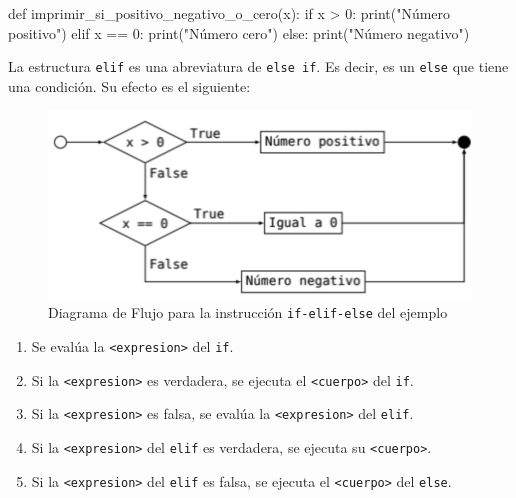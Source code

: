 \documentclass[
  letterpaper,
  DIV=11,
  numbers=noendperiod]{scrreprt}
\newenvironment{Shaded}{\begin{snugshade}}{\end{snugshade}}
\newcommand{\BuiltInTok}[1]{\textcolor[rgb]{0.00,0.23,0.31}{#1}}
\newcommand{\ControlFlowTok}[1]{\textcolor[rgb]{0.00,0.23,0.31}{#1}}
\newcommand{\DecValTok}[1]{\textcolor[rgb]{0.68,0.00,0.00}{#1}}
\newcommand{\KeywordTok}[1]{\textcolor[rgb]{0.00,0.23,0.31}{#1}}
\newcommand{\NormalTok}[1]{\textcolor[rgb]{0.00,0.23,0.31}{#1}}
\newcommand{\OperatorTok}[1]{\textcolor[rgb]{0.37,0.37,0.37}{#1}}
\newcommand{\StringTok}[1]{\textcolor[rgb]{0.13,0.47,0.30}{#1}}
\providecommand{\tightlist}{%
  \setlength{\itemsep}{0pt}\setlength{\parskip}{0pt}}\usepackage{longtable,booktabs,array}
\begin{document}
\begin{Shaded}
\begin{Highlighting}[]
\KeywordTok{def}\NormalTok{ imprimir\_si\_positivo\_negativo\_o\_cero(x):}
  \ControlFlowTok{if}\NormalTok{ x }\OperatorTok{\textgreater{}} \DecValTok{0}\NormalTok{:}
      \BuiltInTok{print}\NormalTok{(}\StringTok{"Número positivo"}\NormalTok{)}
  \ControlFlowTok{elif}\NormalTok{ x }\OperatorTok{==} \DecValTok{0}\NormalTok{:}
      \BuiltInTok{print}\NormalTok{(}\StringTok{"Número cero"}\NormalTok{)}
  \ControlFlowTok{else}\NormalTok{:}
      \BuiltInTok{print}\NormalTok{(}\StringTok{"Número negativo"}\NormalTok{)}
\end{Highlighting}
\end{Shaded}

La estructura \texttt{elif} es una abreviatura de \texttt{else\ if}. Es
decir, es un \texttt{else} que tiene una condición. Su efecto es el
siguiente:

\begin{figure}

{\centering \includegraphics{imgs/unidad_3/if-elif-else.png}

}

\caption{Diagrama de Flujo para la instrucción \texttt{if-elif-else} del
ejemplo}

\end{figure}

\begin{enumerate}
\def\labelenumi{\arabic{enumi}.}
\tightlist
\item
  Se evalúa la \texttt{\textless{}expresion\textgreater{}} del
  \texttt{if}.
\item
  Si la \texttt{\textless{}expresion\textgreater{}} es verdadera, se
  ejecuta el \texttt{\textless{}cuerpo\textgreater{}} del \texttt{if}.
\item
  Si la \texttt{\textless{}expresion\textgreater{}} es falsa, se evalúa
  la \texttt{\textless{}expresion\textgreater{}} del \texttt{elif}.
\item
  Si la \texttt{\textless{}expresion\textgreater{}} del \texttt{elif} es
  verdadera, se ejecuta su \texttt{\textless{}cuerpo\textgreater{}}.
\item
  Si la \texttt{\textless{}expresion\textgreater{}} del \texttt{elif} es
  falsa, se ejecuta el \texttt{\textless{}cuerpo\textgreater{}} del
  \texttt{else}.
\end{enumerate}
\end{document}
